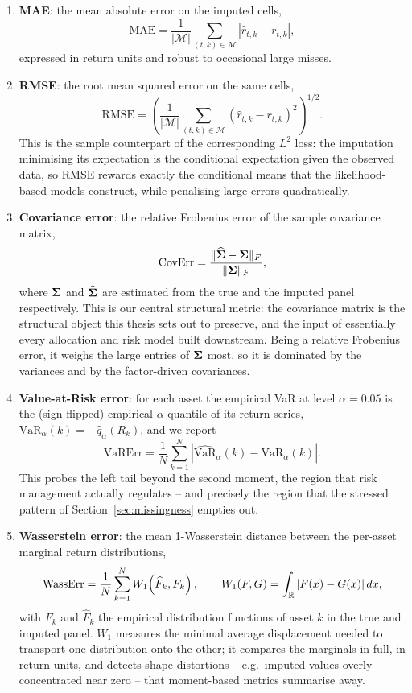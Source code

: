 \begin{enumerate}
    \item \textbf{MAE}: the mean absolute error on the imputed cells,
    \[
    \mathrm{MAE}
    = \frac{1}{|\mathcal{M}|} \sum_{(t,k) \in \mathcal{M}}
      \left| \hat{r}_{t,k} - r_{t,k} \right| ,
    \]
    expressed in return units and robust to occasional large misses.

    \item \textbf{RMSE}: the root mean squared error on the same cells,
    \[
    \mathrm{RMSE}
    = \left( \frac{1}{|\mathcal{M}|} \sum_{(t,k) \in \mathcal{M}}
      \left( \hat{r}_{t,k} - r_{t,k} \right)^2 \right)^{1/2} .
    \]
    This is the sample counterpart of the corresponding $L^2$ loss: the
    imputation minimising its expectation is the conditional expectation given
    the observed data, so RMSE rewards exactly the conditional means that the
    likelihood-based models construct, while penalising large errors
    quadratically.

    \item \textbf{Covariance error}: the relative Frobenius error of the
    sample covariance matrix,
    \[
    \mathrm{CovErr}
    = \frac{\lVert \widehat{\boldsymbol{\Sigma}} - \boldsymbol{\Sigma} \rVert_F}
           {\lVert \boldsymbol{\Sigma} \rVert_F} ,
    \]
    where $\boldsymbol{\Sigma}$ and $\widehat{\boldsymbol{\Sigma}}$ are estimated from the true and
    the imputed panel respectively. This is our central structural metric: the
    covariance matrix is the structural object this thesis sets out to
    preserve, and the input of essentially every allocation and risk model
    built downstream. Being a relative Frobenius error, it weighs the large
    entries of $\boldsymbol{\Sigma}$ most, so it is dominated by the variances and by the
    factor-driven covariances.

    \item \textbf{Value-at-Risk error}: for each asset the empirical VaR at
    level $\alpha = 0.05$ is the (sign-flipped) empirical $\alpha$-quantile
    of its return series, $\mathrm{VaR}_\alpha(k) = -\hat{q}_\alpha(R_k)$,
    and we report
    \[
    \mathrm{VaRErr}
    = \frac{1}{N} \sum_{k=1}^{N}
      \left| \widehat{\mathrm{VaR}}_\alpha(k) - \mathrm{VaR}_\alpha(k) \right| .
    \]
    This probes the left tail beyond the second moment, the region that risk
    management actually regulates -- and precisely the region that the
    stressed pattern of Section~\ref{sec:missingness} empties out.

    \item \textbf{Wasserstein error}: the mean 1-Wasserstein distance
    between the per-asset marginal return distributions,
    \[
    \mathrm{WassErr}
    = \frac{1}{N} \sum_{k=1}^{N} W_1\!\left( \widehat{F}_k, F_k \right),
    \qquad
    W_1(F, G) = \int_{\mathbb{R}} \left| F(x) - G(x) \right| dx ,
    \]
    with $F_k$ and $\widehat{F}_k$ the empirical distribution functions of
    asset $k$ in the true and imputed panel. $W_1$ measures the minimal
    average displacement needed to transport one distribution onto the
    other; it compares the marginals in full, in return units, and detects
    shape distortions -- e.g.\ imputed values overly concentrated near zero
    -- that moment-based metrics summarise away.


\end{enumerate}
